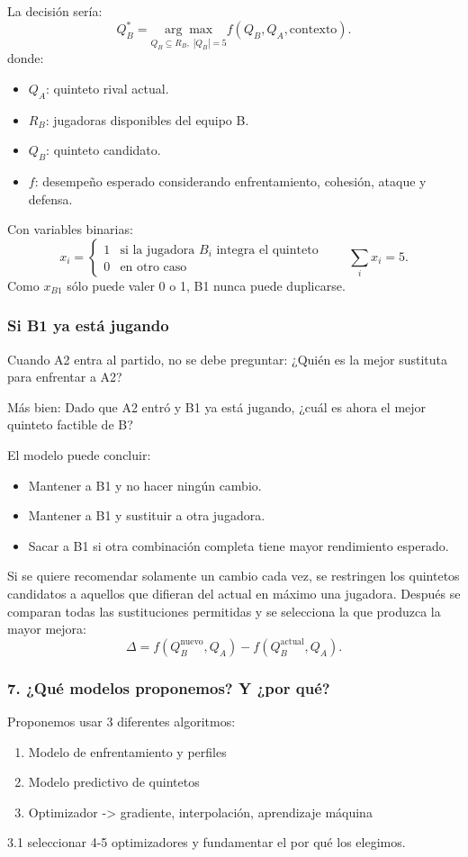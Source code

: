 La decisión sería:
\[
Q_B^*=\underset{Q_B\subseteq R_B,\;|Q_B|=5}{\arg\max}f(Q_B,Q_A,\text{contexto}).
\]
donde:
\begin{itemize}
\item $Q_A$: quinteto rival actual.
\item $R_B$: jugadoras disponibles del equipo B.
\item $Q_B$: quinteto candidato.
\item $f$: desempeño esperado considerando enfrentamiento, cohesión, ataque y defensa.
\end{itemize}
Con variables binarias:
\[
x_i=\begin{cases}1&\text{si la jugadora }B_i\text{ integra el quinteto}\\0&\text{en otro caso}\end{cases}
\qquad \sum_i x_i=5.
\]
Como $x_{B1}$ sólo puede valer 0 o 1, B1 nunca puede duplicarse.

\subsubsection*{Si B1 ya está jugando}
Cuando A2 entra al partido, no se debe preguntar: ¿Quién es la mejor sustituta para enfrentar a A2?

Más bien: Dado que A2 entró y B1 ya está jugando, ¿cuál es ahora el mejor quinteto factible de B?

El modelo puede concluir:
\begin{itemize}
\item Mantener a B1 y no hacer ningún cambio.
\item Mantener a B1 y sustituir a otra jugadora.
\item Sacar a B1 si otra combinación completa tiene mayor rendimiento esperado.
\end{itemize}
Si se quiere recomendar solamente un cambio cada vez, se restringen los quintetos candidatos a aquellos que difieran del actual en máximo una jugadora. Después se comparan todas las sustituciones permitidas y se selecciona la que produzca la mayor mejora:
\[
\Delta=f(Q_B^{\mathrm{nuevo}},Q_A)-f(Q_B^{\mathrm{actual}},Q_A).
\]

\subsubsection*{7. ¿Qué modelos proponemos? Y ¿por qué?}
Proponemos usar 3 diferentes algoritmos:
\begin{enumerate}
\item Modelo de enfrentamiento y perfiles
\item Modelo predictivo de quintetos
\item Optimizador -> gradiente, interpolación, aprendizaje máquina
\end{enumerate}
3.1 seleccionar 4-5 optimizadores y fundamentar el por qué los elegimos.

